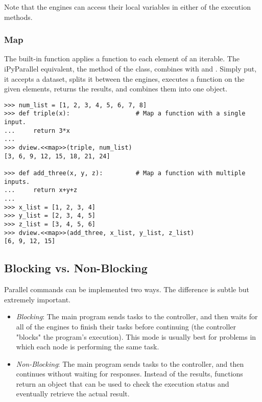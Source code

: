 Note that the engines can access their local variables in either of the execution methods.

\subsubsection*{Map} %

The built-in  function applies a function to each element of an iterable.
The iPyParallel equivalent, the  method of the  class, combines  with  and .
Simply put, it accepts a dataset, splits it between the engines, executes a function on the given elements, returns the results, and combines them into one object.

\begin{lstlisting}
>>> num_list = [1, 2, 3, 4, 5, 6, 7, 8]
>>> def triple(x):                  # Map a function with a single input.
...     return 3*x
...
>>> dview.<<map>>(triple, num_list)
[3, 6, 9, 12, 15, 18, 21, 24]

>>> def add_three(x, y, z):         # Map a function with multiple inputs.
...     return x+y+z
...
>>> x_list = [1, 2, 3, 4]
>>> y_list = [2, 3, 4, 5]
>>> z_list = [3, 4, 5, 6]
>>> dview.<<map>>(add_three, x_list, y_list, z_list)
[6, 9, 12, 15]
\end{lstlisting}


\subsection*{Blocking vs. Non-Blocking} %

Parallel commands can be implemented two ways.
The difference is subtle but extremely important.

\begin{itemize}
\item \emph{Blocking}: %
The main program sends tasks to the controller, and then waits for all of the engines to finish their tasks before continuing (the controller "blocks" the program's execution).
This mode is usually best for problems in which each node is performing the same task.
\item \emph{Non-Blocking}:
The main program sends tasks to the controller, and then continues without waiting for responses.
Instead of the results, functions return an  object that can be used to check the execution status and eventually retrieve the actual result.
\end{itemize}

